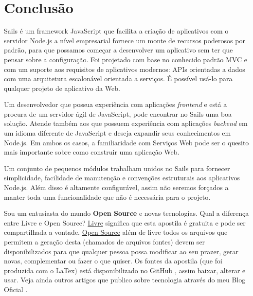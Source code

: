 \documentclass[a4paper,11pt]{article}
\begin{document}
\section{Conclusão}
Sails é um framework JavaScript que facilita a criação de aplicativos com o servidor Node.js a nível empresarial fornece um monte de recursos poderosos por padrão, para que possamos começar a desenvolver um aplicativo sem ter que pensar sobre a configuração. Foi projetado com base no conhecido padrão MVC e com um suporte aos requisitos de aplicativos modernos: APIs orientadas a dados com uma arquitetura escalonável orientada a serviços. É possível usá-lo para qualquer projeto de aplicativo da Web.

Um desenvolvedor que possua experiência com aplicações \textit{frontend} e está a procura de um servidor ágil de JavaScript, pode encontrar no Sails uma boa solução. Atende também aos que possuem experiência com aplicações \textit{backend} em um idioma diferente de JavaScript e deseja expandir seus conhecimentos em Node.js. Em ambos os casos, a familiaridade com Serviços Web pode ser o quesito mais importante sobre como construir uma aplicação Web.

Um conjunto de pequenos módulos trabalham unidos no Sails para fornecer simplicidade, facilidade de manutenção e convenções estruturais aos aplicativos Node.js. Além disso é altamente configurável, assim não seremos forçados a manter toda uma funcionalidade que não é necessária para o projeto. 

Sou um entusiasta do mundo \textbf{Open Source} e novas tecnologias. Qual a diferença entre Livre e Open Source? \underline{Livre} significa que esta apostila é gratuita e pode ser compartilhada a vontade. \underline{Open Source} além de livre todos os arquivos que permitem a geração desta (chamados de arquivos fontes) devem ser disponibilizados para que qualquer pessoa possa modificar ao seu prazer, gerar novas, complementar ou fazer o que quiser. Os fontes da apostila (que foi produzida com o LaTex) está disponibilizado no GitHub \cite{github}, assim baixar, alterar e usar. Veja ainda outros artigos que publico sobre tecnologia através do meu Blog Oficial \cite{fernandoanselmo}.
\end{document}
